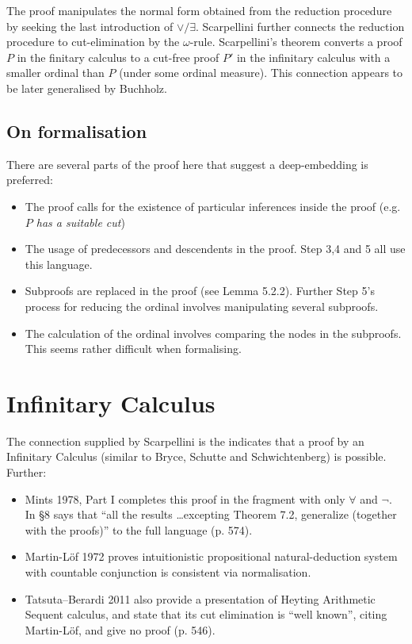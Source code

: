 The proof manipulates the normal form obtained from the reduction procedure by seeking the last introduction of $\lor/\exists$. Scarpellini further connects the reduction procedure to cut-elimination by the $\omega$-rule. Scarpellini's theorem converts a proof $P$ in the finitary calculus to a cut-free proof $P'$ in the infinitary calculus with a smaller ordinal than $P$ (under some ordinal measure). This connection appears to be later generalised by Buchholz.

\subsection{On formalisation}

There are several parts of the proof here that suggest a deep-embedding is preferred:
\begin{itemize}
    \item The proof calls for the existence of particular inferences inside the proof (e.g. \emph{$P$ has a suitable cut})
    \item The usage of predecessors and descendents in the proof. Step 3,4 and 5 all use this language.
    \item Subproofs are replaced in the proof (see Lemma 5.2.2). Further Step 5's process for reducing the ordinal involves manipulating several subproofs.
    \item The calculation of the ordinal involves comparing the nodes in the subproofs. This seems rather difficult when formalising.
\end{itemize}

\section{Infinitary Calculus}

The connection supplied by Scarpellini is the indicates that a proof by an Infinitary Calculus (similar to Bryce, Schutte and Schwichtenberg) is possible. Further:
\begin{itemize}
    \item Mints 1978, Part I completes this proof in the fragment with only $\forall$ and $\lnot$. In §8 says that ``all the results \dots excepting Theorem 7.2, generalize (together with the proofs)'' to the full language (p. 574).
    \item Martin-Löf 1972 proves intuitionistic propositional natural-deduction system with countable conjunction is consistent via normalisation.
    \item Tatsuta–Berardi 2011 also provide a presentation of Heyting Arithmetic Sequent calculus, and state that its cut elimination is “well known”, citing Martin-Löf, and give no proof (p. 546).
\end{itemize}

